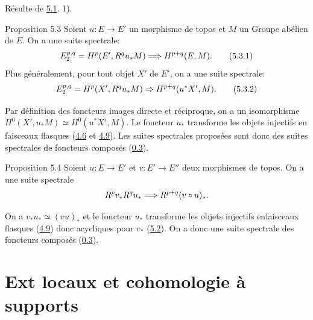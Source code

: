 \documentclass[10pt]{../fichiers-configuration-latex/smfart}
\begin{document}
Résulte de \hyperref[V.prop5.1]{5.1}. 1).

\begin{enonce*}{Proposition 5.3}
Soient $u : E \to E'$ un morphisme de topos et $M$ un Groupe abélien
de $E$. On a une suite spectrale:
\begin{equation*}
E^{p, q}_2 = H^p(E', R^q u_\ast M) \Longrightarrow H^{p + q} (E,
M){}.\tag{5.3.1}
\end{equation*}
Plus généralement, pour tout objet $X'$ de $E'$, on a une suite
spectrale:
\begin{equation}
E^{p, q}_2 = H^p(X', R^q u_\ast M) \Rightarrow H^{p + q} (u^\ast X',
M){}.\tag{5.3.2}
\end{equation}
\end{enonce*}

Par définition des foncteurs images directe et réciproque, on a un
isomorphisme $H^{0} (X', u_\ast M) \simeq H^{0} (u^\ast X', M)$. Le
foncteur $u_\ast$ transforme les objets injectifs en faisceaux flasques
(\hyperref[V.subsec4.6]{4.6} et \hyperref[V.prop4.9]{4.9}). Les suites spectrales proposées sont donc des suites
spectrales de foncteurs composés (\hyperref[V.prop0.3]{0.3}).

\begin{enonce*}{Proposition 5.4}
Soient $u : E \to E'$ et $v : E' \to E''$ deux morphismes de
topos. On a une suite spectrale
$$
R^p v_\ast R^q u_\ast \Longrightarrow R^{p+q} (v \circ u)_\ast {}.
$$
\end{enonce*}

On a $v_\ast u_\ast \simeq (vu)_\ast$ et le foncteur $u_\ast$
transforme les objets injectifs en\pageoriginale faisceaux flasques
(\hyperref[V.prop4.9]{4.9}) donc acycliques pour $v_\ast$ (\hyperref[V.prop5.2]{5.2}).
On a donc une suite spectrale des foncteurs composés
(\hyperref[V.prop0.3]{0.3}).

\section{Ext locaux et cohomologie à supports}

\setcounter{subsection}{-1}
\subsection{}
\end{document}
